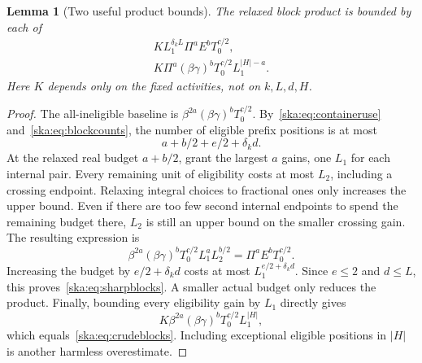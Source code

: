\documentclass[11pt,letterpaper]{article}
\newtheorem{lemma}[theorem]{Lemma}
\theoremstyle{definition}
\begin{document}
\begin{lemma}[Two useful product bounds]\label{ska:lem:product}
The relaxed block product is bounded by each of
\begin{align}
K L_1^{\delta_kL}\Pi^a E^b T_0^{c/2},\label{ska:eq:sharpblocks}\\
K\Pi^a(\beta\gamma)^bT_0^{c/2}L_1^{|H|-a}.\label{ska:eq:crudeblocks}
\end{align}
Here $K$ depends only on the fixed activities, not on $k,L,d,H$.
\end{lemma}
\begin{proof}
The all-ineligible baseline is $\beta^{2a}(\beta\gamma)^bT_0^{c/2}$. By~\eqref{ska:eq:containeruse} and~\eqref{ska:eq:blockcounts}, the number of eligible prefix positions is at most
\[
a+b/2+e/2+\delta_kd.
\]
At the relaxed real budget $a+b/2$, grant the largest $a$ gains, one $L_1$ for each internal pair. Every remaining unit of eligibility costs at most $L_2$, including a crossing endpoint. Relaxing integral choices to fractional ones only increases the upper bound. Even if there are too few second internal endpoints to spend the remaining budget there, $L_2$ is still an upper bound on the smaller crossing gain. The resulting expression is
\[
\beta^{2a}(\beta\gamma)^bT_0^{c/2}L_1^aL_2^{b/2}
=\Pi^aE^bT_0^{c/2}.
\]
Increasing the budget by $e/2+\delta_kd$ costs at most $L_1^{e/2+\delta_kd}$. Since $e\le2$ and $d\le L$, this proves~\eqref{ska:eq:sharpblocks}. A smaller actual budget only reduces the product. Finally, bounding every eligibility gain by $L_1$ directly gives
\[
K\beta^{2a}(\beta\gamma)^bT_0^{c/2}L_1^{|H|},
\]
which equals~\eqref{ska:eq:crudeblocks}. Including exceptional eligible positions in $|H|$ is another harmless overestimate.
\end{proof}
\end{document}
